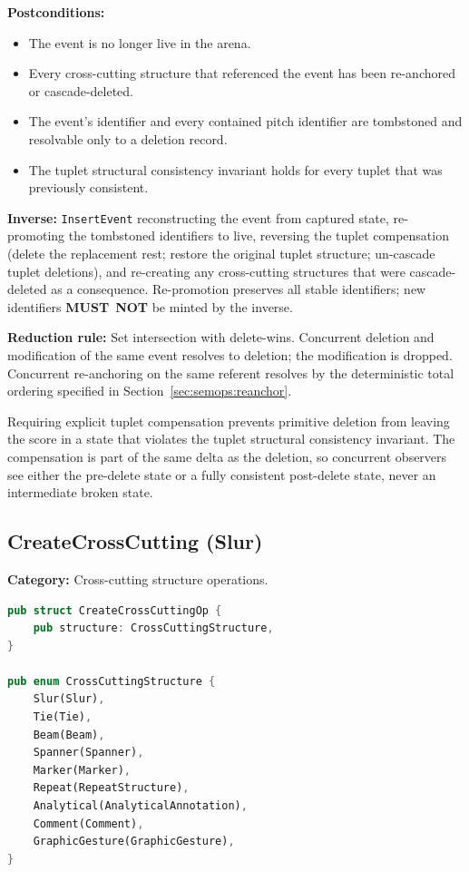 \documentclass[11pt,letterpaper]{report}
\newcommand{\MUSTNOT}{\textbf{MUST}\nobreak\ \textbf{NOT}}
\begin{document}
\textbf{Postconditions:}
\begin{itemize}
  \item The event is no longer live in the arena.
  \item Every cross-cutting structure that referenced the event has
    been re-anchored or cascade-deleted.
  \item The event's identifier and every contained pitch identifier
    are tombstoned and resolvable only to a deletion record.
  \item The tuplet structural consistency invariant holds for every
    tuplet that was previously consistent.
\end{itemize}

\textbf{Inverse:} \texttt{InsertEvent} reconstructing the event from
captured state, re-promoting the tombstoned identifiers to live,
reversing the tuplet compensation (delete the replacement rest;
restore the original tuplet structure; un-cascade tuplet deletions),
and re-creating any cross-cutting structures that were
cascade-deleted as a consequence. Re-promotion preserves all stable
identifiers; new identifiers \MUSTNOT{} be minted by the inverse.

\textbf{Reduction rule:} Set intersection with delete-wins. Concurrent
deletion and modification of the same event resolves to deletion;
the modification is dropped. Concurrent re-anchoring on the same
referent resolves by the deterministic total ordering specified in
Section~\ref{sec:semops:reanchor}.

\begin{rationale}
  Requiring explicit tuplet compensation prevents primitive deletion
  from leaving the score in a state that violates the tuplet
  structural consistency invariant. The compensation is part of the
  same delta as the deletion, so concurrent observers see either
  the pre-delete state or a fully consistent post-delete state, never
  an intermediate broken state.
\end{rationale}

\subsection{CreateCrossCutting (Slur)}

\textbf{Category:} Cross-cutting structure operations.

\begin{lstlisting}[language=Rust]
pub struct CreateCrossCuttingOp {
    pub structure: CrossCuttingStructure,
}

pub enum CrossCuttingStructure {
    Slur(Slur),
    Tie(Tie),
    Beam(Beam),
    Spanner(Spanner),
    Marker(Marker),
    Repeat(RepeatStructure),
    Analytical(AnalyticalAnnotation),
    Comment(Comment),
    GraphicGesture(GraphicGesture),
}
\end{lstlisting}
\end{document}
